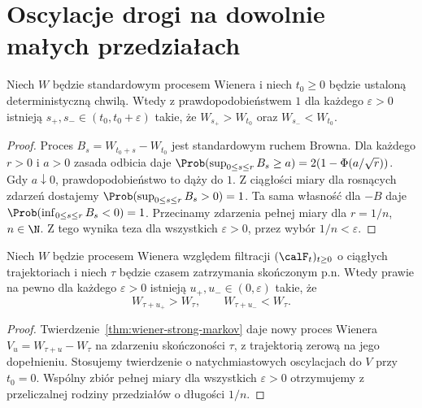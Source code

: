 \section{Oscylacje drogi na dowolnie małych przedziałach}
\begin{twierdzenie}
Niech $W$ będzie standardowym procesem Wienera i niech
$t_0\ge0$ będzie ustaloną deterministyczną chwilą.
Wtedy z prawdopodobieństwem $1$ dla każdego $\varepsilon>0$
istnieją $s_+,s_-\in(t_0,t_0+\varepsilon)$ takie, że
$W_{s_+}>W_{t_0}$ oraz $W_{s_-}<W_{t_0}$.
\end{twierdzenie}
\begin{proof}
Proces $B_s=W_{t_0+s}-W_{t_0}$ jest standardowym
ruchem Browna. Dla każdego $r>0$ i $a>0$ zasada odbicia
daje
$\Prob(\sup_{0\le s\le r}B_s\ge a)=2(1-\Phi(a/\sqrt r))$.
Gdy $a\downarrow0$, prawdopodobieństwo to dąży do $1$.
Z ciągłości miary dla rosnących zdarzeń dostajemy
$\Prob(\sup_{0\le s\le r}B_s>0)=1$.
Ta sama własność dla $-B$ daje
$\Prob(\inf_{0\le s\le r}B_s<0)=1$.
Przecinamy zdarzenia pełnej miary dla $r=1/n$,
$n\in\N$. Z tego wynika teza dla wszystkich
$\varepsilon>0$, przez wybór $1/n<\varepsilon$.
\end{proof}

\begin{wniosek}
Niech $W$ będzie procesem Wienera względem filtracji
$(\calF_t)_{t\ge0}$ o ciągłych trajektoriach i niech
$\tau$ będzie czasem zatrzymania skończonym p.n.
Wtedy prawie na pewno dla każdego $\varepsilon>0$
istnieją $u_+,u_-\in(0,\varepsilon)$ takie, że
\[
W_{\tau+u_+}>W_\tau,\qquad
W_{\tau+u_-}<W_\tau.
\]
\end{wniosek}
\begin{proof}
Twierdzenie~\ref{thm:wiener-strong-markov} daje
nowy proces Wienera $V_u=W_{\tau+u}-W_\tau$
na zdarzeniu skończoności $\tau$, z trajektorią
zerową na jego dopełnieniu. Stosujemy twierdzenie
o natychmiastowych oscylacjach do $V$ przy $t_0=0$.
Wspólny zbiór pełnej miary dla wszystkich
$\varepsilon>0$ otrzymujemy z przeliczalnej
rodziny przedziałów o długości $1/n$.
\end{proof}

